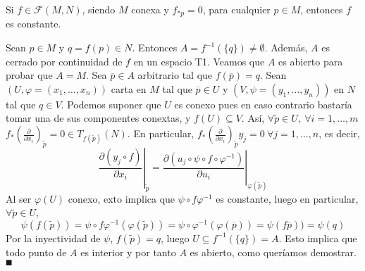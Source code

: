 \documentclass[Cursovd_portada.tex]{subfiles}
\begin{document}
\begin{prop} Si $f\in\mathcal{F}(M,N)$, siendo $M$ conexa y $f_{*p}=0$, para cual\-quier $p\in M$, entonces $f$
es constante.
\end{prop}
\begin{dem}
Sean $p\in M$ y $q=f(p)\in N$. Entonces $A=f^{-1}(\{q\})\neq\emptyset$. Además, $A$ es cerrado por continuidad de $f$ en un espacio T1. Veamos que $A$ es abierto para probar que $A=M$. Sea $\overline{p}\in A$ arbitrario tal que $f(\overline{p})=q$. Sean $(U,\varphi=(x_1,\dots,x_n))$ carta en $M$ tal que $\overline{p}\in U$ y $(V,\psi=(y_1,\dots,y_n))$ en $N$ tal que $q\in V$. Podemos suponer que $U$ es conexo pues en caso contrario bastaría tomar una de sus componentes conextas, y $f(U)\subseteq V$. Así, $\forall \tilde{p}\in U,\ \forall i=1,\dots, m$ $f_*\left(\frac{\partial}{\partial x_i}\right)_{\tilde{p}}=0\in T_{f(\tilde{p})}(N)$. En particular, $f_*\left(\frac{\partial}{\partial x_i}\right)_{\tilde{p}}y_j=0\ \forall j=1,\dots, n$, es decir, 
$$\left.\frac{\partial(y_j\circ f)}{\partial x_i}\right|_{\tilde{p}}=\left.\frac{\partial(u_j\circ\psi\circ f\circ\varphi^{-1})}{\partial u_i}\right|_{\varphi(\tilde{p})}$$
Al ser $\varphi(U)$ conexo, exto implica que $\psi\circ f\varphi^{-1}$ es constante, luego en particular, $\forall \tilde{p}\in U$, 
$$\psi(f(\tilde{p}))=\psi\circ f\varphi^{-1}(\varphi(\tilde{p}))=\psi\circ\varphi^{-1}(\varphi(\overline{p}))=\psi(f\overline{p}))=\psi(q)$$
Por la inyectividad de $\psi$, $f(\tilde{p})=q$, luego $U\subseteq f^{-1}(\{q\})=A$. Esto implica que todo punto de $A$ es interior y por tanto $A$ es abierto, como queríamos demostrar. $\QED$
\end{dem}
\end{document}
